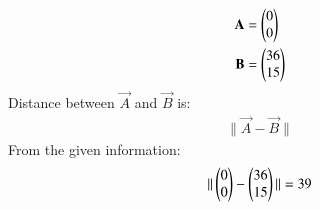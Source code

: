 \solution 
\begin{align}
\mathbf{A} &=\begin{pmatrix}0\\0\end{pmatrix} \label{eq:constr_a}\\
\mathbf{B} &=\begin{pmatrix}36\\15\end{pmatrix} \label{eq:constr_b}
\end{align}
Distance between $\vec{A}$ and $\vec{B}$ is:
\begin{align}
\| \vec{A} - \vec{B} \| 
\end{align}
From the given information:
\begin{align}
\| \begin{pmatrix}0\\0\end{pmatrix} - \begin{pmatrix}36\\15\end{pmatrix} \| = 39
\end{align}






